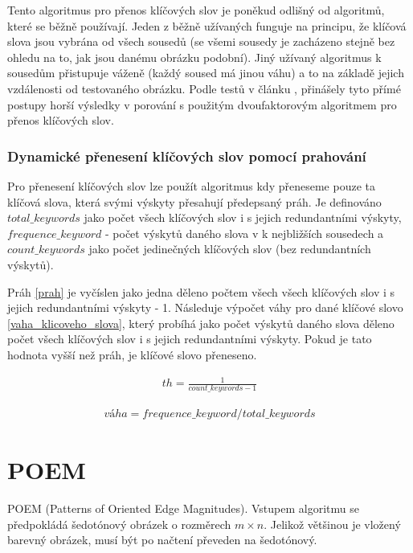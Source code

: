 \documentclass[czech,BP]{thesiskiv}
\begin{document}
\par Tento algoritmus pro přenos klíčových slov je poněkud odlišný od algoritmů, které se běžně používají. Jeden z běžně užívaných funguje na principu, že klíčová slova jsou vybrána od všech sousedů (se všemi sousedy je zacházeno stejně bez ohledu na to, jak jsou danému obrázku podobní). Jiný užívaný algoritmus k sousedům přistupuje váženě (každý soused má jinou váhu) a to na základě jejich vzdálenosti od testovaného obrázku. Podle testů v článku \citep{JEC}, přinášely tyto přímé postupy horší výsledky v porování s použitým dvoufaktorovým algoritmem pro přenos klíčových slov. \\
 
\subsection{Dynamické přenesení klíčových slov pomocí prahování}
\par Pro přenesení klíčových slov lze použít algoritmus kdy přeneseme pouze ta klíčová slova, která svými výskyty přesahují předepsaný práh. Je definováno $total\_keywords$ jako počet všech klíčových slov i s jejich redundantními výskyty, $frequence\_keyword$ - počet výskytů daného slova v k nejbližších sousedech a $count\_keywords$ jako počet jedinečných klíčových slov (bez redundantních výskytů).  

\par Práh \eqref{prah} je vyčíslen jako jedna děleno počtem všech všech klíčových slov i s jejich redundantními výskyty - 1. Následuje výpočet váhy pro dané klíčové slovo \eqref{vaha_klicoveho_slova}, který probíhá jako počet výskytů daného slova děleno počet všech klíčových slov i s jejich redundantními výskyty. Pokud je tato hodnota vyšší než práh, je klíčové slovo přeneseno.

\begin{align}
   \label{prah} th = \frac{1}{count\_keywords-1}
\end{align}

\begin{align}
   \label{vaha_klicoveho_slova} váha = frequence\_keyword / total\_keywords
\end{align} 
 
\chapter{POEM}
POEM (Patterns of Oriented Edge Magnitudes). Vstupem algoritmu se předpokládá šedotónový obrázek o rozměrech  $m \times n$. Jelikož většinou je vložený barevný obrázek, musí být po načtení převeden na šedotónový. \cite{SrovnaniDeskriptoru}
\end{document}
